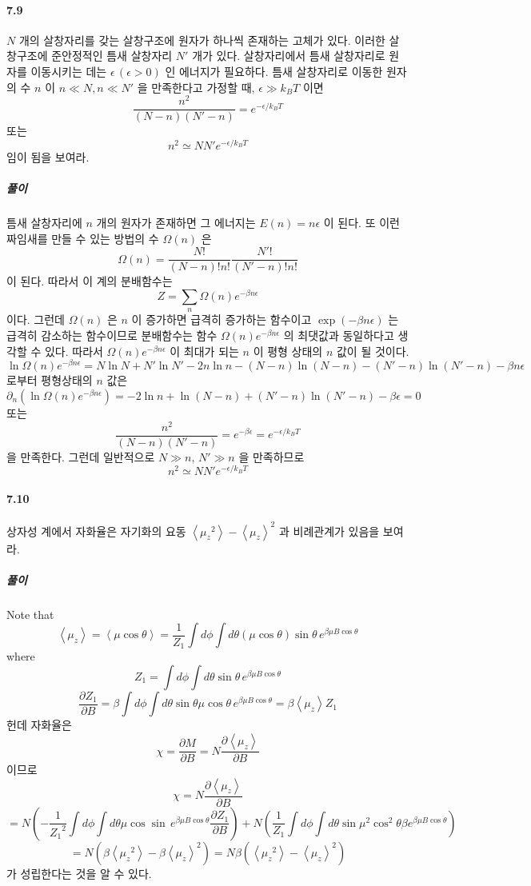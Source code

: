 \documentclass[a4paper,12pt]{report}
\newcommand{\mean}[1]{\left\langle #1 \right\rangle }
\begin{document}
	\paragraph{7.9 }$N$ 개의 살창자리를 갖는 살창구조에 원자가 하나씩 존재하는 고체가 있다. 이러한 살창구조에 준안정적인 틈새 살창자리 $N'$ 개가 있다. 살창자리에서 틈새 살창자리로 원자를 이동시키는 데는 $\epsilon\,(\epsilon>0)$ 인 에너지가 필요하다. 틈새 살창자리로 이동한 원자의 수 $n$ 이 $n\ll N, n\ll N'$ 을 만족한다고 가정할 때, $\epsilon\gg k_BT$ 이면 
	$$\frac{n^2}{(N-n)(N'-n)}=e^{-\epsilon/k_BT}$$ 또는
	$$n^2\simeq NN'e^{-\epsilon/k_BT}$$
	임이 됨을 보여라. 
	\subparagraph{풀이} 틈새 살창자리에 $n$ 개의 원자가 존재하면 그 에너지는 $E(n)=n\epsilon$ 이 된다. 또 이런 짜임새를 만들 수 있는 방법의 수 $\Omega(n)$ 은 
	$$\Omega(n)=\frac{N!}{(N-n)!n!}\frac{N'!}{(N'-n)!n!}$$
	이 된다. 따라서 이 계의 분배함수는
	$$Z=\sum_{n}\Omega(n)e^{-\beta n \epsilon}$$ 
	이다. 그런데 $\Omega(n)$ 은 $n$ 이 증가하면 급격히 증가하는 함수이고 $\exp(-\beta n\epsilon)$ 는 급격히 감소하는 함수이므로 분배함수는 함수 $\Omega(n)e^{-\beta n\epsilon}$ 의 최댓값과 동일하다고 생각할 수 있다. 따라서 $\Omega(n)e^{-\beta n\epsilon}$ 이 최대가 되는 $n$ 이 평형 상태의 $n$ 값이 될 것이다.
	$$\ln\Omega(n)e^{-\beta n\epsilon}=N\ln N+N'\ln N'-2n\ln n-(N-n)\ln(N-n)-(N'-n)\ln(N'-n)-\beta n\epsilon$$
	로부터 평형상태의 $n$ 값은
	$$\partial_n(\ln\Omega(n)e^{-\beta n\epsilon})=-2\ln n+\ln(N-n)+(N'-n)\ln(N'-n)-\beta\epsilon=0$$
	또는
	$$\frac{n^2}{(N-n)(N'-n)}=e^{-\beta\epsilon}=e^{-\epsilon/k_BT}$$
	을 만족한다. 그런데 일반적으로 $N\gg n,\, N'\gg n$ 을 만족하므로 
	$$n^2\simeq NN'e^{-\epsilon/k_BT}$$
	\paragraph{7.10 } 상자성 계에서 자화율은 자기화의 요동 $\mean{{\mu_z}^2}-\mean{\mu_z}^2$ 과 비례관계가 있음을 보여라.
	\subparagraph{풀이} Note that 
	$$\mean{\mu_z}=\mean{\mu \cos\theta}=\frac{1}{Z_1}\int d\phi\int d\theta (\mu \cos\theta)\sin\theta\,e^{\beta\mu B\cos\theta}$$
	where
	$$Z_1=\int d\phi\int d\theta \sin\theta\,e^{\beta\mu B\cos\theta}$$
	$$\frac{\partial Z_1}{\partial B}=\beta\int d\phi\int d\theta \sin\theta\mu\cos\theta\,e^{\beta\mu B\cos\theta}=\beta\mean{\mu_z}Z_1$$
	헌데 자화율은 
	$$\chi=\frac{\partial M}{\partial B}=N\frac{\partial \mean{\mu_z}}{\partial B}$$
	이므로
	$$\chi=N\frac{\partial \mean{\mu_z}}{\partial B}$$
	$$=N\left(-\frac{1}{{Z_1}^2}\int d\phi\int d\theta\mu\cos\sin\,e^{\beta\mu B\cos\theta}\frac{\partial Z_1}{\partial B} \right)+N\left(\frac{1}{Z_1}\int d\phi\int d\theta\sin\mu^2\cos^2\theta\beta e^{\beta\mu B\cos\theta} \right)  $$
	$$=N(\beta\mean{{\mu_z}^2}-\beta\mean{\mu_z}^2)=N\beta\left(\mean{{\mu_z}^2}-\mean{\mu_z}^2 \right) $$
	가 성립한다는 것을 알 수 있다. 
\end{document}
